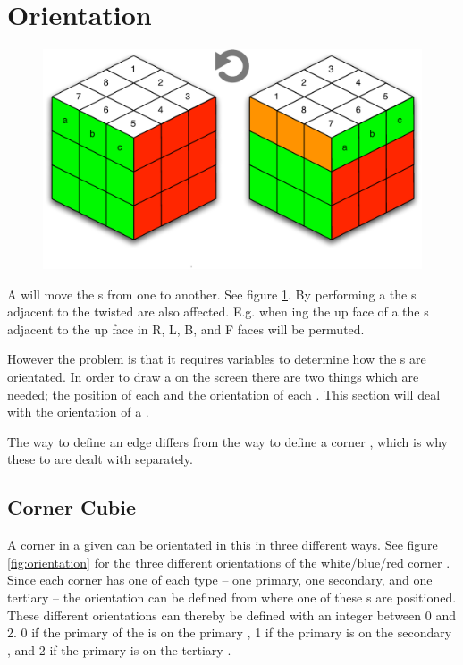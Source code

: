 \section{Orientation}
\label{sec:orientation}

\begin{figure}[h]
	\centering
		\includegraphics[scale=0.5]{input/pics/twistOfUpFace}
	\caption{}
	\label{fig:twistOfUpFace}
\end{figure}

A \face{} will move the \cpiece{}s from one \cubicle{} to another. See figure \ref{fig:twistOfUpFace}. By performing a \twist{} the \face{}s adjacent to the twisted \face{} are also affected. 
E.g. when \twist{}ing the up face of a \rubik{} the \cubie{}s adjacent to the up face in R, L, B, and F faces will be permuted.

However the problem is that it requires variables to determine how the \cubie{}s are orientated. 
In order to draw a \rubik{} on the screen there are two things which are needed; the position of each \cubie{} and the orientation of each \cubie{}. This section will deal with the orientation of a \cubie{}.

The way to define an edge \cubie{} differs from the way to define a corner \cubie{}, which is why these to are dealt with separately.

\subsection{Corner Cubie}
A corner \cubie{} in a given \cubicle{} can be orientated in this \cubicle{} in three different ways. See figure \ref{fig:orientation} for the three different orientations of the white/blue/red corner \cubie{}.
Since each corner \cubie{} has one of each \facelet{} type -- one primary, one secondary, and one tertiary -- the orientation can be defined from where one of these \facelet{}s are positioned.
These different orientations can thereby be defined with an integer between 0 and 2.
0 if the primary \facelet{} of the \cubie{} is on the primary \face{}, 1 if the primary \facelet{} is on the secondary \face{}, and 2 if the primary \facelet{} is on the tertiary \face{}.

